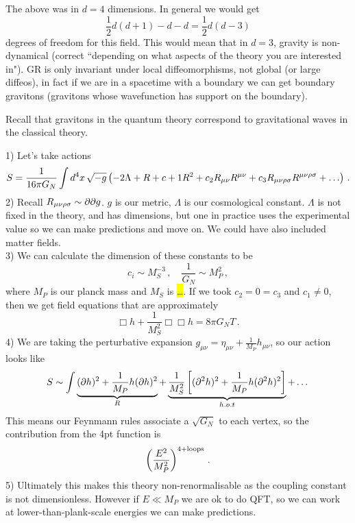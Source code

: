 \documentclass{article}
\begin{document}
\begin{remark}
	The above was in $d=4$ dimensions. In general we would get 
	\[
	\frac{1}{2}d(d+1) - d - d = \frac{1}{2}d(d-3)
	\]
	degrees of freedom for this field. This would mean that in $d=3$, gravity is non-dynamical (correct ``depending on what aspects of the theory you are interested in"). GR is only invariant under local diffeomorphisms, not global (or large diffeos), in fact if we are in a spacetime with a boundary we can get boundary gravitons (gravitons whose wavefunction has support on the boundary).  
\end{remark}

Recall that gravitons in the quantum theory correspond to gravitational waves in the classical theory. 

\begin{example}
	1) Let's take actions 
	\[
	S = \frac{1}{16 \pi G_N} \int d^4x \, \sqrt{-g} \pround{-2\Lambda + R + c+1 R^2 + c_2 R_{\mu \nu} R^{\mu\nu} + c_3 R_{\mu\nu\rho\sigma}  R^{\mu\nu\rho\sigma} +\dots } \, .
	\]
	2) Recall $R_{\mu\nu\rho\sigma} \sim \partial \partial g$. $g$ is our metric, $\Lambda$ is our cosmological constant. $\Lambda$ is not fixed in the theory, and has dimensions, but one in practice uses the experimental value so we can make predictions and move on. We could have also included matter fields. \\
	3) We can calculate the dimension of these constants to be 
	\[
	c_i \sim M_S^{-3} \, , \quad \frac{1}{G_N} \sim M_P^2 \, ,
	\]
	where $M_P$ is our planck mass and $M_S$ is \hl{\dots}. If we took $c_2 = 0 = c_3$ and $c_1 \neq 0$, then we get field equations that are approximately 
	\begin{equation}\label{eq: theory 1}
	\Box h + \frac{1}{M_S^2} \Box \Box h  = 8\pi G_N T \, .
	\end{equation}
	4) We are taking the perturbative expansion $g_{\mu\nu} =  \eta_{\mu\nu} + \frac{1}{M_P} h_{\mu\nu}$, so our action looks like 
	\[
	S \sim \int \underbrace{(\partial h)^2 + \frac{1}{M_P} h(\partial h)^2}_{R} + \underbrace{\frac{1}{M_S^2} \left[ (\partial^2 h)^2 + \frac{1}{M_P} h (\partial^2 h)^2 \right]}_{h.o.t} + \dots 
	\]
	This means our Feynmann rules associate a $\sqrt{G_N}$ to each vertex, so the contribution from the 4pt function is 
	\[
	\left( \frac{E^2}{M_P^2} \right)^{4+\text{loops}} \, .
	\]
	5) Ultimately this makes this theory non-renormalisable as the coupling constant is not dimensionless. However if $E \ll M_P$ we are ok to do QFT, so we can work at lower-than-plank-scale energies we can make predictions. 
\end{example}
\end{document}
